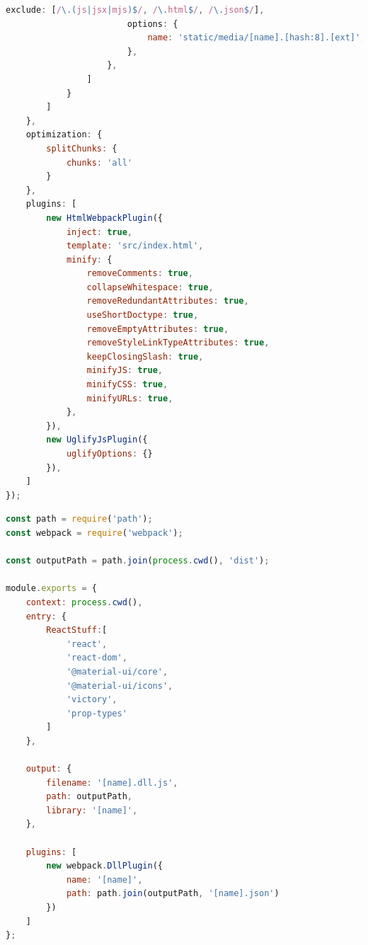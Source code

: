 \documentclass[11pt]{report}
\begin{document}
\begin{lstlisting}[language=JavaScript,label={figure:baselineConfiguration},caption={Ausgangskonfiguration für Webpack 4 (webpack.config.js)}]
                        exclude: [/\.(js|jsx|mjs)$/, /\.html$/, /\.json$/],
                        options: {
                            name: 'static/media/[name].[hash:8].[ext]',
                        },
                    },
                ]
            }
        ]
    },
    optimization: {
        splitChunks: {
            chunks: 'all'
        }
    },
    plugins: [
        new HtmlWebpackPlugin({
            inject: true,
            template: 'src/index.html',
            minify: {
                removeComments: true,
                collapseWhitespace: true,
                removeRedundantAttributes: true,
                useShortDoctype: true,
                removeEmptyAttributes: true,
                removeStyleLinkTypeAttributes: true,
                keepClosingSlash: true,
                minifyJS: true,
                minifyCSS: true,
                minifyURLs: true,
            },
        }),
        new UglifyJsPlugin({
            uglifyOptions: {}
        }),
    ]
});
	\end{lstlisting}
	\pagebreak
	\begin{lstlisting}[language=JavaScript,caption={Scoped compilation Konfigurationsdatei (webpack.vendor.config.js)},label={vendorConfig}]
const path = require('path');
const webpack = require('webpack');

const outputPath = path.join(process.cwd(), 'dist');

module.exports = {
    context: process.cwd(),
    entry: {
        ReactStuff:[
            'react',
            'react-dom',
            '@material-ui/core',
            '@material-ui/icons',
            'victory',
            'prop-types'
        ]
    },

    output: {
        filename: '[name].dll.js',
        path: outputPath,
        library: '[name]',
    },

    plugins: [
        new webpack.DllPlugin({
            name: '[name]',
            path: path.join(outputPath, '[name].json')
        })
    ]
};
	\end{lstlisting}
\end{document}
